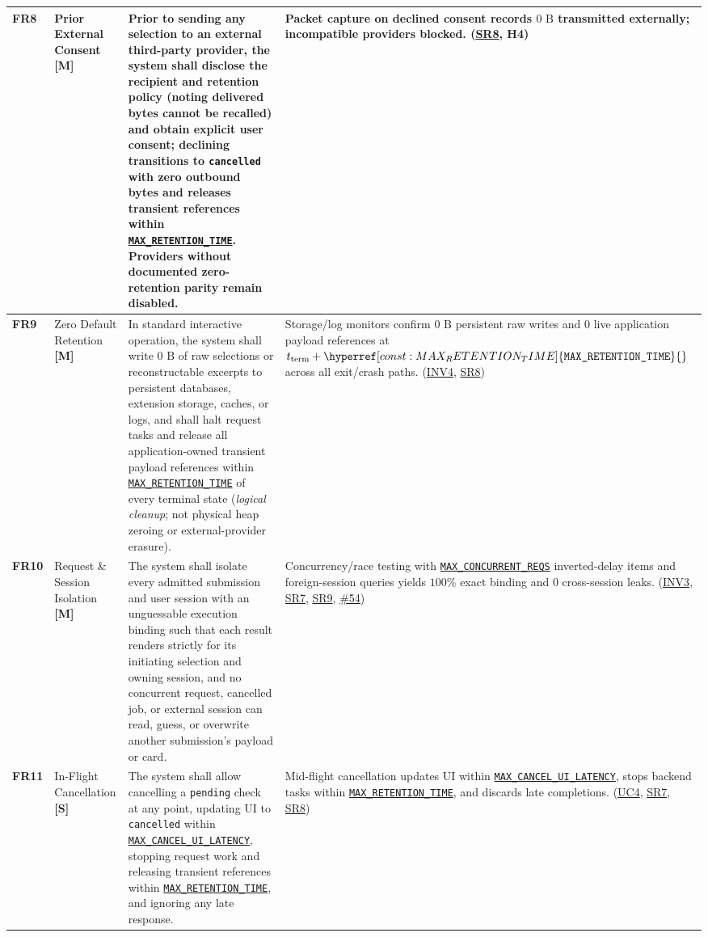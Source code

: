 \documentclass[11pt]{article}
\newcommand{\MaxRetentionTime}{\hyperref[const:MAX_RETENTION_TIME]{\texttt{MAX\_\allowbreak{}RETENTION\_\allowbreak{}TIME}}}
\newcommand{\MaxConcurrentReqs}{\hyperref[const:MAX_CONCURRENT_REQS]{\texttt{MAX\_\allowbreak{}CONCURRENT\_\allowbreak{}REQS}}}
\newcommand{\MaxCancelUiLatency}{\hyperref[const:MAX_CANCEL_UI_LATENCY]{\texttt{MAX\_\allowbreak{}CANCEL\_\allowbreak{}UI\_\allowbreak{}LATENCY}}}
\begin{document}
{\begin{tabularx}{\textwidth}{P{1.1cm} P{2.25cm} Y Q{3.85cm}}
\label{FR8}\textbf{FR8} & Prior External Consent \textbf{[M]} &
Prior to sending any selection to an external third-party provider, the system shall disclose the recipient and retention policy (noting delivered bytes cannot be recalled) and obtain explicit user consent; declining transitions to \texttt{cancelled} with zero outbound bytes and releases transient references within \MaxRetentionTime{}. Providers without documented zero-retention parity remain disabled. &
Packet capture on declined consent records $0\text{ B}$ transmitted externally; incompatible providers blocked. (\hyperref[SR8]{SR8}, \textbf{H4})\\
\midrule

\label{FR9}\textbf{FR9} & Zero Default Retention \textbf{[M]} &
In standard interactive operation, the system shall write $0\text{ B}$ of raw selections or reconstructable excerpts to persistent databases, extension storage, caches, or logs, and shall halt request tasks and release all application-owned transient payload references within \MaxRetentionTime{} of every terminal state (\emph{logical cleanup}; not physical heap zeroing or external-provider erasure). &
Storage/log monitors confirm $0\text{ B}$ persistent raw writes and $0$ live application payload references at $t_{\text{term}}+\MaxRetentionTime{}$ across all exit/crash paths. (\hyperref[INV4]{INV4}, \hyperref[SR8]{SR8})\\
\midrule

\label{FR10}\textbf{FR10} & Request \& Session Isolation \textbf{[M]} &
The system shall isolate every admitted submission and user session with an unguessable execution binding such that each result renders strictly for its initiating selection and owning session, and no concurrent request, cancelled job, or external session can read, guess, or overwrite another submission's payload or card. &
Concurrency/race testing with \MaxConcurrentReqs{} inverted-delay items and foreign-session queries yields $100\%$ exact binding and $0$ cross-session leaks. (\hyperref[INV3]{INV3}, \hyperref[SR7]{SR7}, \hyperref[SR9]{SR9}, \href{https://github.com/richy1337/Verity/issues/54}{\#54})\\
\midrule

\label{FR11}\textbf{FR11} & In-Flight Cancellation \textbf{[S]} &
The system shall allow cancelling a \texttt{pending} check at any point, updating UI to \texttt{cancelled} within \MaxCancelUiLatency{}, stopping request work and releasing transient references within \MaxRetentionTime{}, and ignoring any late response. &
Mid-flight cancellation updates UI within \MaxCancelUiLatency{}, stops backend tasks within \MaxRetentionTime{}, and discards late completions. (\hyperref[UC4]{UC4}, \hyperref[SR7]{SR7}, \hyperref[SR8]{SR8})\\
\midrule


\end{tabularx}}
\end{document}
